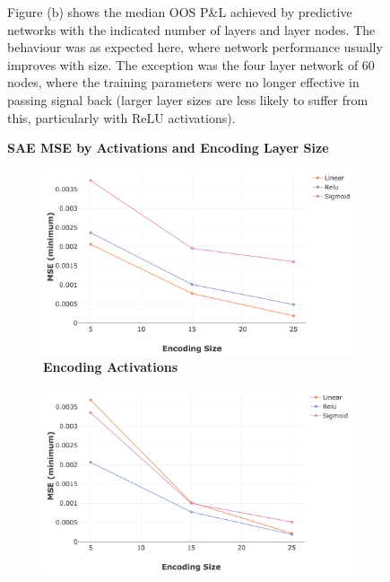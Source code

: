 \documentclass[a4paper,11pt,oneside]{article}
\theoremstyle{plain}
\theoremstyle{definition}
\begin{document}
\begin{figure}[H]
{			\newline Figure (b) shows the median OOS P\&L achieved by predictive networks with the indicated number of layers and layer nodes. The behaviour was as expected here, where network performance usually improves with size. The exception was the four layer network of 60 nodes, where the training parameters were no longer effective in passing signal back (larger layer sizes are less likely to suffer from this, particularly with ReLU activations).
		}
		\label{figure-network_size}
	\end{figure}
	
	\newpage
	\begin{figure}[H]
		\centering
		\textbf{SAE MSE by Activations and Encoding Layer Size}
		\begin{subfigure}{.99\textwidth}
			\centering 
			\includegraphics[scale=0.4]{images/results/8_7_network/actual_mse_encoding.png}
			\caption[MSE by Activations and Encoding Layer Size - Encoding Activations]{\textbf{Encoding Activations} 
				\newline }
			\label{figure-actual_mse_encoding_activations}
		\end{subfigure}
		\begin{subfigure}{.99\textwidth}
			\centering 
			\includegraphics[scale=0.4]{images/results/8_7_network/actual_mse_hidden.png}

\end{subfigure}
\end{figure}
\end{document}
